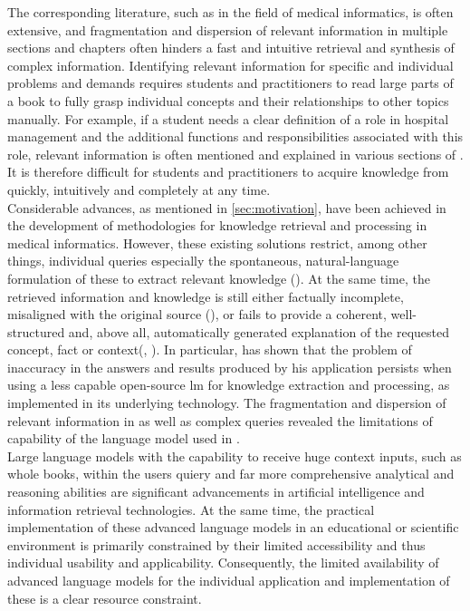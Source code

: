 The corresponding literature, such as \citet{bb2} in the field of medical informatics, is often extensive, and fragmentation and dispersion of relevant information in multiple sections and chapters often hinders a fast and intuitive retrieval and synthesis of complex information.
%
Identifying relevant information for specific and individual problems and demands requires students and practitioners to read large parts of a book to fully grasp individual concepts and their relationships to other topics manually.
%
For example, if a student needs a clear definition of a role in hospital management and the additional functions and responsibilities associated with this role, relevant information is often mentioned and explained in various sections of \citet{bb2}.\\
%
It is therefore difficult for students and practitioners to acquire knowledge from \citet{bb2} quickly, intuitively and completely at any time.\\
%
Considerable advances, as mentioned in \cref{sec:motivation}, have been achieved in the development of methodologies for knowledge retrieval and processing in medical informatics. 
%
However, these existing solutions restrict, among other things, individual queries especially the spontaneous, natural-language formulation of these to extract relevant knowledge (\citet{snikquiz}).
At the same time, the retrieved information and knowledge is still either factually incomplete, misaligned with the original source (\citet{Paul_Keller}), or fails to provide a coherent, well-structured and, above all, automatically generated explanation of the requested concept, fact or context(\citet{snikquiz}, \citet{hannesbell}).
In particular, \citet{Paul_Keller} has shown that the problem of inaccuracy in the answers and results produced by his application persists when using a less capable open-source \ac{lm} for knowledge extraction and processing, as implemented in its underlying technology.
The fragmentation and dispersion of relevant information in \citet{bb2} as well as complex queries revealed the limitations of capability of the language model used in \citet{Paul_Keller}.\\
Large language models with the capability to receive huge context inputs, such as whole books, within the users quiery and far more comprehensive analytical and reasoning abilities are significant advancements in artificial intelligence and information retrieval technologies.
At the same time, the practical implementation of these advanced language models in an educational or scientific environment is primarily constrained by their limited accessibility and thus individual usability and applicability.
Consequently, the limited availability of advanced language models for the individual application and implementation of these is a clear resource constraint. 
 
